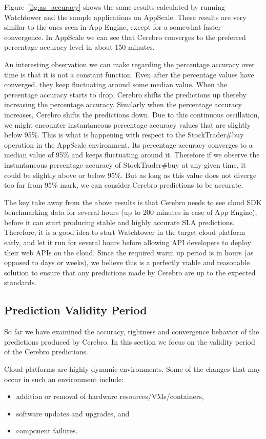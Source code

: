 Figure~\ref{fig:as_accuracy} shows the same results calculated by running Watchtower and the sample applications on AppScale.
These results are very similar to the ones seen in App Engine, except for a somewhat faster convergence. In AppScale
we can see that Cerebro converges to the preferred percentage accuracy level in about 150 minutes.

An interesting observation we can make regarding the percentage accuracy over time is that it is not a constant function. 
Even after the percentage values have converged, they keep fluctuating 
around some median value. When the percentage accuracy starts to drop, Cerebro shifts the predictions up thereby increasing
the percentage accuracy. Similarly when the percentage accuracy increases, Cerebro shifts the predictions down. Due to this
continuous oscillation, we might encounter instantaneous percentage accuracy values that are slightly 
below 95\%. This is what is
happening with respect to the StockTrader\#buy operation in the AppScale environment. Its percentage accuracy converges to a median
value of 95\% and keeps fluctuating around it. Therefore if we observe the instantaneous percentage accuracy of 
StockTrader\#buy at any given time, it
could be slightly above or below 95\%. 
But as long as this value does not diverge too far from 95\% mark, we can consider Cerebro predictions to
be accurate.

The key take away from the above results is that Cerebro needs to see cloud SDK benchmarking data 
for several hours (up to 200 minutes in case of 
App Engine), before it can start producing stable and highly accurate SLA predictions. Therefore, it is a good idea to start Watchtower in the
target cloud platform early, and let it run for several hours before allowing API developers to deploy their web APIs on the cloud. Since the
required warm up period is in hours (as opposed to days or weeks), we believe this is a perfectly viable and reasonable solution to
ensure that any predictions made by Cerebro are up to the expected standards.

\subsection{Prediction Validity Period}
So far we have examined the accuracy, tightness and convergence behavior of the predictions produced by Cerebro. In this section we 
focus on the validity period of the Cerebro predictions.

Cloud platforms are highly dynamic environments. Some of the changes that may occur in such an environment include:
\begin{itemize}
\item addition or removal of hardware resources/VMs/containers,
\item software updates and upgrades, and
\item component failures.
\end{itemize}

